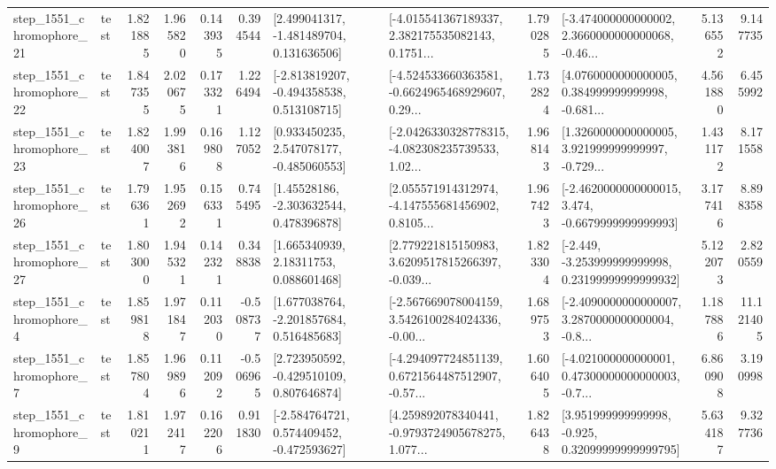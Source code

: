 \begin{tabular}{llrrrrllrlrr}
 step\_1551\_chromophore\_21 &      test &      1.821885 &    1.965820 &      0.143935 &  0.394544 &    [2.499041317, -1.481489704, 0.131636506] &  [-4.015541367189337, 2.382175535082143, 0.1751... &       1.790285 &  [-3.474000000000002, 2.3660000000000068, -0.46... &            5.136552 &          9.147735 \\
 step\_1551\_chromophore\_22 &      test &      1.847355 &    2.020675 &      0.173321 &  1.226494 &   [-2.813819207, -0.494358538, 0.513108715] &  [-4.524533660363581, -0.6624965468929607, 0.29... &       1.732824 &  [4.0760000000000005, 0.384999999999998, -0.681... &            4.561880 &          6.455992 \\
 step\_1551\_chromophore\_23 &      test &      1.824007 &    1.993816 &      0.169808 &  1.127052 &    [0.933450235, 2.547078177, -0.485060553] &  [-2.0426330328778315, -4.082308235739533, 1.02... &       1.968143 &  [1.3260000000000005, 3.921999999999997, -0.729... &            1.431172 &          8.171558 \\
 step\_1551\_chromophore\_26 &      test &      1.796361 &    1.952692 &      0.156331 &  0.745495 &     [1.45528186, -2.303632544, 0.478396878] &  [2.055571914312974, -4.147555681456902, 0.8105... &       1.967423 &  [-2.4620000000000015, 3.474, -0.6679999999999993] &            3.177416 &          8.898358 \\
 step\_1551\_chromophore\_27 &      test &      1.803000 &    1.945321 &      0.142321 &  0.348838 &      [1.665340939, 2.18311753, 0.088601468] &  [2.779221815150983, 3.6209517815266397, -0.039... &       1.823304 &  [-2.449, -3.253999999999998, 0.23199999999999932] &            5.122073 &          2.820559 \\
  step\_1551\_chromophore\_4 &      test &      1.859818 &    1.971847 &      0.112030 & -0.508737 &    [1.677038764, -2.201857684, 0.516485683] &  [-2.567669078004159, 3.5426100284024336, -0.00... &       1.689753 &  [-2.4090000000000007, 3.2870000000000004, -0.8... &            1.187886 &         11.121405 \\
  step\_1551\_chromophore\_7 &      test &      1.857804 &    1.969896 &      0.112092 & -0.506965 &    [2.723950592, -0.429510109, 0.807646874] &  [-4.294097724851139, 0.6721564487512907, -0.57... &       1.606405 &  [-4.021000000000001, 0.47300000000000003, -0.7... &            6.860908 &          3.190998 \\
  step\_1551\_chromophore\_9 &      test &      1.810211 &    1.972417 &      0.162206 &  0.911830 &   [-2.584764721, 0.574409452, -0.472593627] &  [4.259892078340441, -0.9793724905678275, 1.077... &       1.826438 &   [3.951999999999998, -0.925, 0.32099999999999795] &            5.634187 &          9.327736 \\

\end{tabular}
